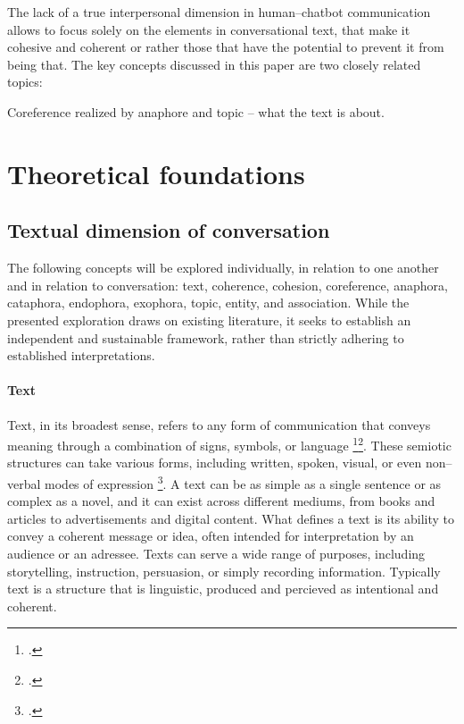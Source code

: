 \documentclass[12pt]{report}
\begin{document}
{\par
The lack of a true interpersonal dimension in human–chatbot communication
allows to focus solely on the elements in conversational text,
that make it cohesive and coherent or rather
those that have the potential to prevent it from being that.
The key concepts discussed in this paper are
two closely related topics:

Coreference realized by anaphore and topic – what the text is about.



\chapter{Theoretical foundations}


\section{Textual dimension of conversation}
\par
    The following concepts will be explored individually, in relation to one another and in relation to conversation:
    text, coherence, cohesion, coreference, anaphora, cataphora, endophora, exophora, topic, entity, and association.
    While the presented exploration draws on existing literature,
    it seeks to establish an independent and sustainable framework,
    rather than strictly adhering to established interpretations.

\subsubsection{Text}
\par
    Text, in its broadest sense, refers to any form of communication that conveys meaning through a combination of signs, symbols, or language \footcite[p.~7]{hrbacek1994}\footcite{hjelmslev2016}.
    These semiotic structures can take various forms, including written, spoken, visual, or even non–verbal modes of expression \footcite[p.~13]{barthes1977image}.
    A text can be as simple as a single sentence or as complex as a novel, and it can exist across different mediums, from books and articles to advertisements and digital content.
    What defines a text is its ability to convey a coherent message or idea, often intended for interpretation by an audience or an adressee.
    Texts can serve a wide range of purposes, including storytelling, instruction, persuasion, or simply recording information.
    Typically text is a structure that is
    linguistic, produced and percieved as intentional and coherent.

}
\end{document}
